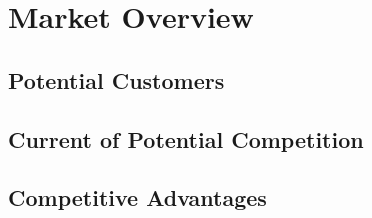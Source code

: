 \section{Market Overview}

\subsection{Potential Customers}
\subsection{Current of Potential Competition}
\subsection{Competitive Advantages}